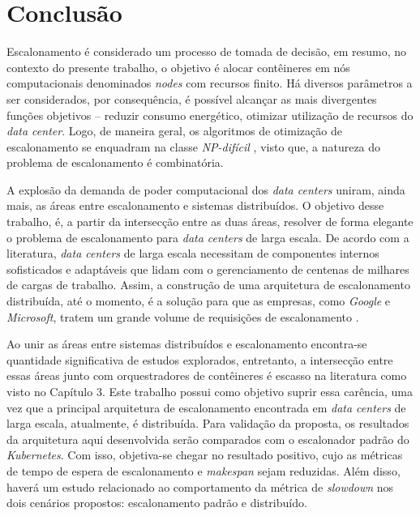 \chapter{Conclusão}

Escalonamento é considerado um processo de tomada de decisão, em resumo, no contexto do presente trabalho, o objetivo é alocar contêineres em nós computacionais denominados \textit{nodes} com recursos finito. Há diversos parâmetros a ser considerados, por consequência, é possível alcançar as mais divergentes funções objetivos -- reduzir consumo energético, otimizar utilização de recursos do \textit{data center}. Logo, de maneira geral, os algoritmos de otimização de escalonamento se enquadram na classe \textit{NP-difícil} \cite{ullman1975np}, visto que, a natureza do problema de escalonamento é combinatória.

A explosão da demanda de poder computacional dos \textit{data centers} uniram, ainda mais, as áreas entre escalonamento e sistemas distribuídos. O objetivo desse trabalho, é, a partir da intersecção entre as duas áreas, resolver de forma elegante o problema de escalonamento para \textit{data centers} de larga escala. De acordo com a literatura, \textit{data centers} de larga escala necessitam de componentes internos sofisticados e adaptáveis que lidam com o gerenciamento de centenas de milhares de cargas de trabalho. Assim, a construção de uma arquitetura de escalonamento distribuída, até o momento, é a solução para que as empresas, como \textit{Google} e \textit{Microsoft}, tratem um grande volume de requisições de escalonamento \cite{Wang2019Pigeon, Google2015Borg}.

Ao unir as áreas entre sistemas distribuídos e escalonamento encontra-se quantidade significativa de estudos explorados, entretanto, a intersecção entre essas áreas junto com orquestradores de contêineres é escasso na literatura como visto no Capítulo 3. Este trabalho possui como objetivo suprir essa carência, uma vez que a principal arquitetura de escalonamento encontrada em \textit{data centers} de larga escala, atualmente, é distribuída. Para validação da proposta, os resultados da arquitetura aqui desenvolvida serão comparados com o escalonador padrão do \textit{Kubernetes}. Com isso, objetiva-se chegar no resultado positivo, cujo as métricas de tempo de espera de escalonamento e \textit{makespan} sejam reduzidas. Além disso, haverá um estudo relacionado ao comportamento da métrica de \textit{slowdown} nos dois cenários propostos: escalonamento padrão e distribuído.


